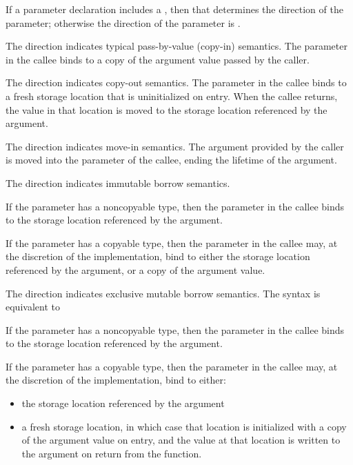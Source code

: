 If a parameter declaration includes a , then that determines the direction of the parameter; otherwise the direction of the parameter is .


The  direction indicates typical pass-by-value (copy-in) semantics.
The parameter in the callee binds to a copy of the argument value passed by the caller.


The  direction indicates copy-out semantics.
The parameter in the callee binds to a fresh storage location that is uninitialized on entry.
When the callee returns, the value in that location is moved to the storage location referenced by the argument.


The  direction indicates move-in semantics.
The argument provided by the caller is moved into the parameter of the callee, ending the lifetime of the argument.


The  direction indicates immutable borrow semantics.

If the parameter has a noncopyable type, then the parameter in the callee binds to the storage location referenced by the argument.

If the parameter has a copyable type, then the parameter in the callee may, at the discretion of the implementation, bind to either the storage location referenced by the argument, or a copy of the argument value.


The  direction indicates exclusive mutable borrow semantics.
The syntax  is equivalent to 

If the parameter has a noncopyable type, then the parameter in the callee binds to the storage location referenced by the argument.

If the parameter has a copyable type, then the parameter in the callee may, at the discretion of the implementation, bind to either:

\begin{itemize}
\item the storage location referenced by the argument
\item a fresh storage location, in which case that location is initialized with a copy of the argument value on entry, and the value at that location is written to the argument on return from the function.
\end{itemize}

